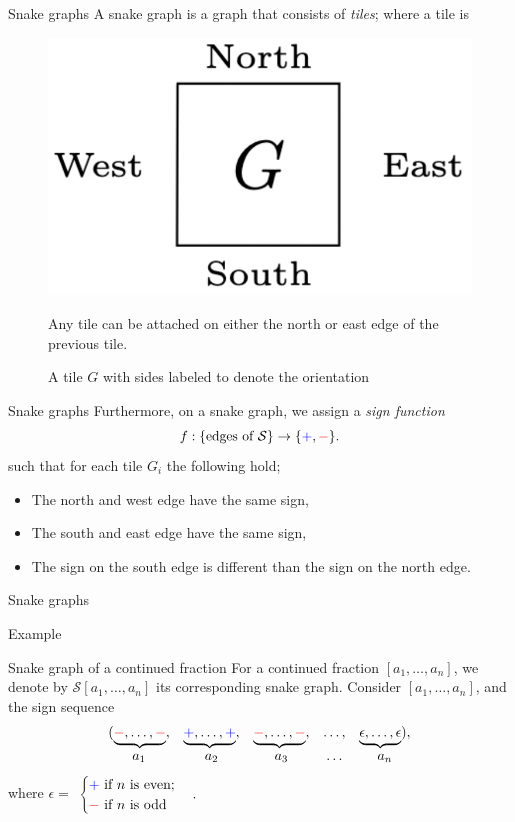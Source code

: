 \documentclass{beamer}
\def\rmin{\ensuremath\textcolor{red}{-} }
\def\bplus{\ensuremath\textcolor{blue}{+} }
\begin{document}
\begin{frame}{Snake graphs}
    A snake graph is a graph that consists of \emph{tiles}; where a tile is \pause
\begin{figure}[H]
    \centering
    \includegraphics[width = 2.5 cm]{Images/prestile.png}   
\caption{A tile $G$ with sides labeled to denote the orientation}
\pause Any tile can be attached on either the north or east edge of the previous tile.
\end{figure}
\end{frame}

\begin{frame}{Snake graphs}
    Furthermore, on a snake graph, we assign a \emph{sign function}
    \begin{equation*}
    f: \{\text{edges of} \  \mathcal{S}\} \to \{\bplus,\rmin \}.
\end{equation*}
such that for each tile $G_i$ the following hold; \pause
\begin{itemize}
    \item The north and west edge have the same sign, \pause
    \item The south and east edge have the same sign, \pause
    \item The sign on the south edge is different than the sign on the north edge.
\end{itemize}
\end{frame}

\begin{frame}{Snake graphs}
\begin{exampleblock}{Example}
\centering
\end{exampleblock}
\end{frame}

\begin{frame}{Snake graph of a continued fraction}
For a continued fraction $[a_1,\dots,a_n]$, we denote by $\mathcal{S}[a_1,\dots,a_n]$ its corresponding snake graph. 
\pause Consider $[a_1,\dots,a_n]$, and the sign sequence 
\begin{equation}\label{signsequence}
\begin{array}{cccccccc}
  ( \underbrace{ \rmin,\ldots,\rmin},&  \underbrace{ \bplus ,\dots, \bplus},&  \underbrace{ \rmin,\ldots,\rmin},& \ldots,&  \underbrace{\epsilon,\ldots,\epsilon}) ,  \\
 a_1 & a_2 & a_3&\ldots&a_n
\end{array} 
\end{equation}
where $\epsilon = $
$
\begin{cases}
\bplus  \ \text{if} \ n \ \text{is even}; \\
\rmin \ \text{if} \ n \ \text{is odd}
\end{cases}.
$
\end{frame}
\end{document}
